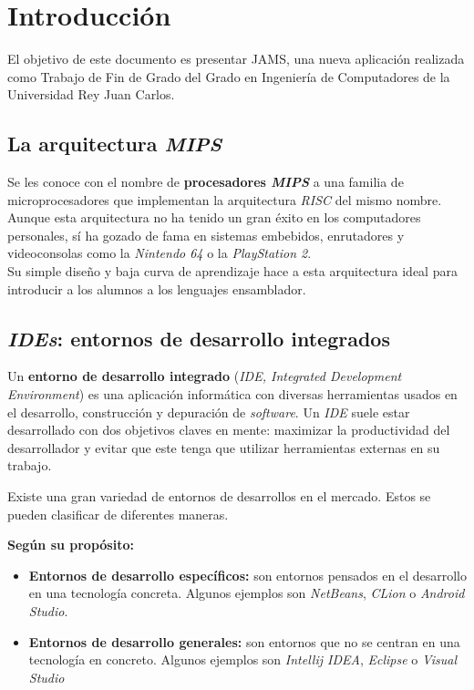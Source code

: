 \chapter{Introducción} \label{cap:intro}

El objetivo de este documento es presentar JAMS, una nueva aplicación realizada como Trabajo de Fin de Grado
del Grado en Ingeniería de Computadores de la Universidad Rey Juan Carlos.


\section{La arquitectura \textit{MIPS}}\label{sec:la-arquitectura-mips}

Se les conoce con el nombre de \textbf{procesadores \textit{MIPS}} a una familia de microprocesadores que implementan
la arquitectura \textit{RISC} del mismo nombre.
Aunque esta arquitectura no ha tenido un gran éxito en los computadores personales, sí ha gozado de fama en
sistemas embebidos, enrutadores y videoconsolas como la \textit{Nintendo 64} o la \textit{PlayStation 2}. \\

\noindent Su simple diseño y baja curva de aprendizaje hace a esta arquitectura ideal para introducir a los alumnos
a los lenguajes ensamblador.


\section{\textit{IDEs}: entornos de desarrollo integrados}\label{sec:ides-entornos-de-desarrollo-integrados}

Un \textbf{entorno de desarrollo integrado} (\textit{IDE, Integrated Development Environment}) es una aplicación
informática con diversas herramientas usados en el desarrollo, construcción y depuración de \textit{software}.
Un \textit{IDE} suele estar desarrollado con dos objetivos claves en mente: maximizar la productividad del
desarrollador y evitar que este tenga que utilizar herramientas externas en su trabajo.

\noindent Existe una gran variedad de entornos de desarrollos en el mercado.
Estos se pueden clasificar de diferentes maneras.

\noindent \textbf{Según su propósito:}
\begin{itemize}
    \item \textbf{Entornos de desarrollo específicos:} son entornos pensados en el desarrollo en una
    tecnología concreta.
    Algunos ejemplos son \textit{NetBeans}, \textit{CLion} o \textit{Android Studio}.
    \item \textbf{Entornos de desarrollo generales:} son entornos que no se centran en una tecnología en concreto.
    Algunos ejemplos son \textit{Intellij IDEA}, \textit{Eclipse} o \textit{Visual Studio}
\end{itemize}

